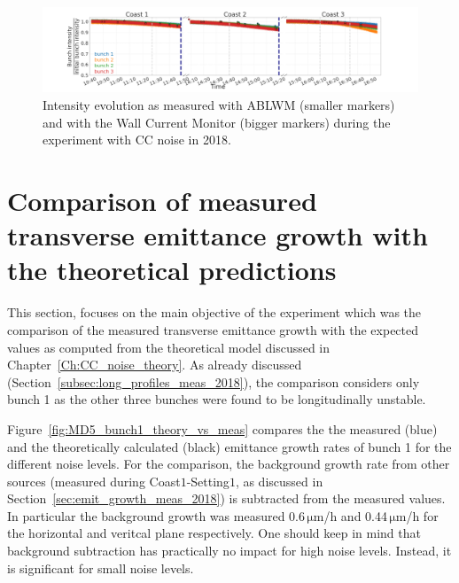 \begin{figure}
   \centering
   \includegraphics[width=1.0\textwidth]{images/Ch5/MD5_overview_intensity_with_wall_current_monitor.png}
   \caption{Intensity evolution as measured with ABLWM (smaller markers) and with the Wall Current Monitor (bigger markers) during the experiment with CC noise in 2018.}
   \label{fig:MD5_overview_intensity}
\end{figure}

\section{Comparison of measured transverse emittance growth with the theoretical predictions}\label{sec:meas_2018_vs_theory}
This section, focuses on the main objective of the experiment which was the comparison of the measured transverse emittance growth with the expected values as computed from the theoretical model discussed in Chapter~\ref{Ch:CC_noise_theory}. As already discussed (Section~\ref{subsec:long_profiles_meas_2018}), the comparison considers only bunch 1 as the other three bunches were found to be longitudinally unstable.

Figure~\ref{fig:MD5_bunch1_theory_vs_meas} compares the the measured (blue) and the theoretically calculated (black) emittance growth rates of bunch 1 for the different noise levels. For the comparison, the background growth rate from other sources (measured during Coast$1$-Setting$1$, as discussed in Section~\ref{sec:emit_growth_meas_2018}) is subtracted from the measured values. In particular the background growth was measured 0.6\,$\mathrm{\mu m}$/h and 0.44\,$\mathrm{\mu m}$/h for the horizontal and veritcal plane respectively. One should keep in mind that background subtraction has practically no impact for high noise levels. Instead, it is significant for small noise levels.


